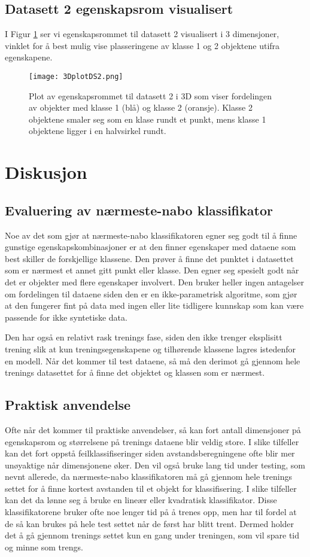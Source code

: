 \documentclass[twocolumn,norwegian]{article}
\begin{document}
\newpage
\subsection{Datasett 2 egenskapsrom visualisert}
I Figur \ref{fig:3DplotDS2} ser vi egenskapsrommet til datasett 2 visualisert i 3 dimensjoner, vinklet for å best mulig vise plasseringene av klasse 1 og 2 objektene utifra egenskapene.

\begin{figure}[ht!]
	\centering
	\texttt{[image: 3DplotDS2.png]}
	\caption{Plot av egenskapsrommet til datasett 2 i 3D som viser fordelingen av objekter med klasse 1 (blå) og klasse 2 (oransje). Klasse 2 objektene smaler seg som en klase rundt et punkt, mens klasse 1 objektene ligger i en halvsirkel rundt. \label{fig:3DplotDS2}}
\end{figure}

\section{Diskusjon}
\subsection{Evaluering av nærmeste-nabo klassifikator}
Noe av det som gjør at nærmeste-nabo klassifikatoren egner seg godt til å finne gunstige egenskapskombinasjoner er at den finner egenskaper med dataene som best skiller de forskjellige klassene. Den prøver å finne det punktet i datasettet som er nærmest et annet gitt punkt eller klasse. Den egner seg spesielt godt når det er objekter med flere egenskaper involvert. Den bruker heller ingen antagelser om fordelingen til dataene siden den er en ikke-parametrisk algoritme, som gjør at den fungerer fint på data med ingen eller lite tidligere kunnskap som kan være passende for ikke syntetiske data.

Den har også en relativt rask trenings fase, siden den ikke trenger eksplisitt trening slik at kun treningsegenskapene og tilhørende klassene lagres istedenfor en modell. Når det kommer til test dataene, så må den derimot gå gjennom hele trenings datasettet for å finne det objektet og klassen som er nærmest.

\subsection{Praktisk anvendelse}
Ofte når det kommer til praktiske anvendelser, så kan fort antall dimensjoner på egenskapsrom og størrelsene på trenings dataene blir veldig store. I slike tilfeller kan det fort oppstå feilklassifiseringer siden avstandsberegningene ofte blir mer unøyaktige når dimensjonene øker. Den vil også bruke lang tid under testing, som nevnt allerede, da nærmeste-nabo klassifikatoren må gå gjennom hele trenings settet for å finne kortest avstanden til et objekt for klassifisering. I slike tilfeller kan det da lønne seg å bruke en lineær eller kvadratisk klassifikator. Disse klassifikatorene bruker ofte noe lenger tid på å trenes opp, men har til fordel at de så kan brukes på hele test settet når de først har blitt trent. Dermed holder det å gå gjennom trenings settet kun en gang under treningen, som vil spare tid og minne som trengs.
\end{document}
